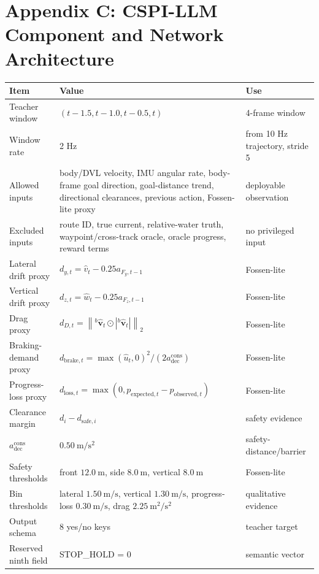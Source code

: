 \documentclass[11pt]{article}
\begin{document}
\clearpage
\section*{Appendix C: CSPI-LLM Component and Network Architecture}

\begin{center}
\scriptsize
\begin{tabularx}{\textwidth}{@{}Z Z Z@{}}
\toprule
Item & Value & Use \\
\midrule
Teacher window & $(t-1.5,t-1.0,t-0.5,t)$ & 4-frame window \\
Window rate & 2 Hz & from 10 Hz trajectory, stride 5 \\
Allowed inputs & body/DVL velocity, IMU angular rate, body-frame goal direction, goal-distance trend, directional clearances, previous action, Fossen-lite proxy & deployable observation \\
Excluded inputs & route ID, true current, relative-water truth, waypoint/cross-track oracle, oracle progress, reward terms & no privileged input \\
Lateral drift proxy & $d_{y,t}=\widehat v_t-0.25a_{F_y,t-1}$ & Fossen-lite \\
Vertical drift proxy & $d_{z,t}=\widehat w_t-0.25a_{F_z,t-1}$ & Fossen-lite \\
Drag proxy & $d_{D,t}=\left\|{}^b\widehat{\mathbf v}_t\odot\left|{}^b\widehat{\mathbf v}_t\right|\right\|_2$ & Fossen-lite \\
Braking-demand proxy & $d_{\mathrm{brake},t}=\max(\hat u_t,0)^2/(2a_{\mathrm{dec}}^{\mathrm{cons}})$ & Fossen-lite \\
Progress-loss proxy & $d_{\mathrm{loss},t}=\max(0,p_{\mathrm{expected},t}-p_{\mathrm{observed},t})$ & Fossen-lite \\
Clearance margin & $d_i-d_{\mathrm{safe},i}$ & safety evidence \\
$a_{\mathrm{dec}}^{\mathrm{cons}}$ & $0.50~\mathrm{m/s^2}$ & safety-distance/barrier \\
Safety thresholds & front $12.0~\mathrm{m}$, side $8.0~\mathrm{m}$, vertical $8.0~\mathrm{m}$ & Fossen-lite \\
Bin thresholds & lateral $1.50~\mathrm{m/s}$, vertical $1.30~\mathrm{m/s}$, progress-loss $0.30~\mathrm{m/s}$, drag $2.25~\mathrm{m^2/s^2}$ & qualitative evidence \\
Output schema & 8 yes/no keys & teacher target \\
Reserved ninth field & STOP\_HOLD = 0 & semantic vector \\

\end{tabularx}
\end{center}
\end{document}
